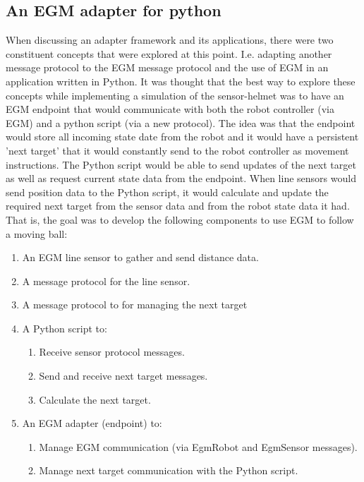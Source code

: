 \documentclass{cslthse-msc}
\begin{document}
\subsection{An EGM adapter for python}
\label{sec:Dev:I2:python_adapter}
When discussing an adapter framework and its applications, there were two constituent concepts that were explored at this point. I.e. adapting another message protocol to the EGM message protocol and the use of EGM in an application written in Python. It was thought that the best way to explore these concepts while implementing a simulation of the sensor-helmet was to have an EGM endpoint that would communicate with both the robot controller (via EGM) and a python script (via a new protocol). The idea was that the endpoint would store all incoming state date from the robot and it would have a persistent 'next target' that it would constantly send to the robot controller as movement instructions. The Python script would be able to send updates of the next target as well as request current state data from the endpoint. When line sensors would send position data to the Python script, it would calculate and update the required next target from the sensor data and from the robot state data it had. That is, the goal was to develop the following components to use EGM to follow a moving ball:
\begin{enumerate}
    \item An EGM line sensor to gather and send distance data.
    \item A message protocol for the line sensor.
    \item A message protocol to for managing the next target
    \item A Python script to:
        \begin{enumerate}
            \item Receive sensor protocol messages.
            \item Send and receive next target messages.
            \item Calculate the next target.
        \end{enumerate}
    \item An EGM adapter (endpoint) to:
        \begin{enumerate}
            \item Manage EGM communication (via EgmRobot and EgmSensor messages).
            \item Manage next target communication with the Python script.
        \end{enumerate}
\end{enumerate}
\end{document}
